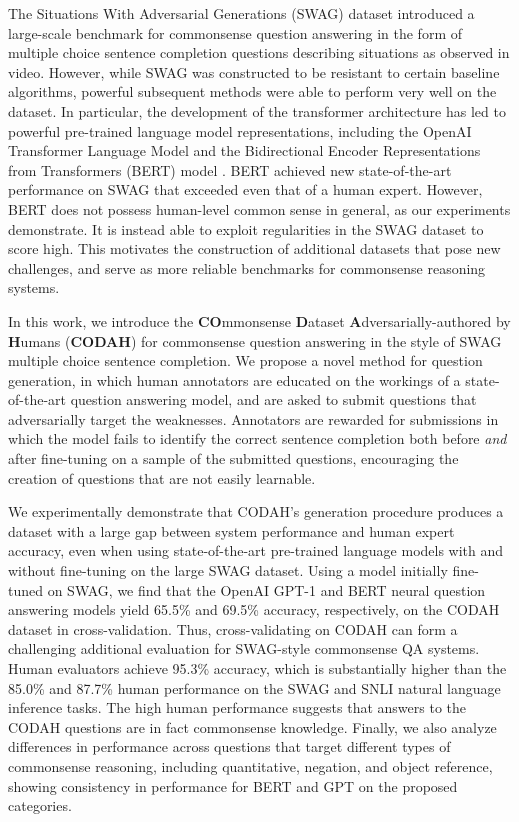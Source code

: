 \documentclass[11pt,a4paper]{article}
\begin{document}
    The Situations With Adversarial Generations (SWAG) dataset \cite{zellers2018swag} introduced a large-scale benchmark for commonsense question answering in the form of multiple choice sentence completion questions describing situations as observed in video.  However, while SWAG was constructed to be resistant to certain baseline algorithms, powerful subsequent methods were able to perform very well on the dataset.  In particular, the development of the transformer architecture \cite{vaswani2017attention} has led to powerful pre-trained language model representations, including the OpenAI Transformer Language Model \cite{radford2018improving} and the Bidirectional Encoder Representations from Transformers (BERT) model \cite{devlin2018bert}. BERT achieved new state-of-the-art performance on SWAG that exceeded even that of a human expert.  However, BERT does not possess human-level common sense in general, as our experiments demonstrate.  It is instead able to exploit regularities in the SWAG dataset to score high. This motivates the construction of additional datasets that pose new challenges, and serve as more reliable benchmarks for commonsense reasoning systems.
    
    In this work, we introduce the \textbf{CO}mmonsense \textbf{D}ataset \textbf{A}dversarially-authored by \textbf{H}umans (\textbf{CODAH}) for commonsense question answering in the style of SWAG multiple choice sentence completion. We propose a novel method for question generation, in which human annotators are educated on the workings of a state-of-the-art question answering model, and are asked to submit questions that adversarially target the weaknesses. Annotators are rewarded for submissions in which the model fails to identify the correct sentence completion both before {\em and} after fine-tuning on a sample of the submitted questions, encouraging the creation of questions that are not easily learnable.
    
    We experimentally demonstrate that CODAH's generation procedure produces a dataset with a large gap between system performance and human expert accuracy, even when using state-of-the-art pre-trained language models with and without fine-tuning on the large SWAG dataset.  Using a model initially fine-tuned on SWAG, we find that the OpenAI GPT-1 and BERT neural question answering models yield 65.5\% and 69.5\% accuracy, respectively, on the CODAH dataset in cross-validation.  Thus, cross-validating on CODAH can form a challenging additional evaluation for SWAG-style commonsense QA systems.
    Human evaluators achieve 95.3\% accuracy, which is substantially higher than the 85.0\% \cite{zellers2018swag} and 87.7\% \cite{ghaeini2018dr} human performance on the SWAG and SNLI natural language inference tasks. The high human performance suggests that answers to the CODAH questions are in fact commonsense knowledge. Finally, we also analyze differences in performance across questions that target different types of commonsense reasoning, including quantitative, negation, and object reference, showing consistency in performance for BERT and GPT on the proposed categories.
\end{document}
